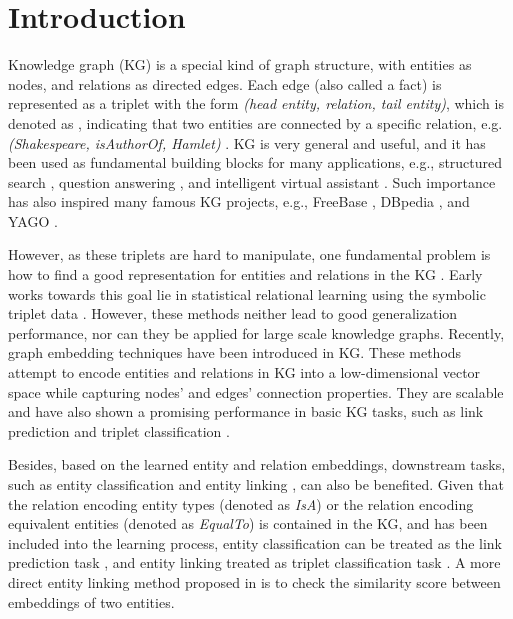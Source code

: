 \documentclass[conference]{IEEEtran}
\begin{document}
\section{Introduction}

Knowledge graph (KG) is a special kind of graph structure, 
with entities as nodes, 
and relations as directed edges. 
Each edge (also called a fact) is represented as a triplet with the form \emph{(head entity, relation, tail entity)}, 
which is denoted as , indicating that two entities are connected by a specific relation, 
e.g. \emph{(Shakespeare, isAuthorOf,  Hamlet)} \cite{bollacker2008freebase,miller1995wordnet,auer2007dbpedia,suchanek2007yago}.
KG is very general and useful,
and it has been used as fundamental building blocks for many applications,
e.g., structured search \cite{singhal2012introducing},
question answering \cite{bordes2014open, bordes2014question},
and intelligent virtual assistant \cite{white1991knowledge}.
Such importance
has also inspired many famous KG projects,
e.g.,
FreeBase \cite{bollacker2008freebase},
DBpedia \cite{auer2007dbpedia},
and YAGO \cite{suchanek2007yago}.


However,
as these triplets are hard to manipulate,
one fundamental problem is how to find a good representation for entities and relations in the KG \cite{nickel2016review}.
Early works towards this goal lie in statistical relational learning using the symbolic triplet data \cite{kok2007statistical, getoor2007introduction, lao2011random}. 
However, these methods neither lead to good generalization performance, 
nor can they be applied for large scale knowledge graphs. 
Recently, 
graph embedding techniques \cite{wang2017knowledge} have been introduced in KG.
These methods attempt to encode entities and relations in KG into a low-dimensional vector space
while capturing nodes' and edges' connection properties.
They are scalable and have also shown a promising performance in basic KG tasks, 
such as link prediction and triplet classification \cite{bordes2013translating, wang2017knowledge}. 

{
Besides,
based on the learned entity and relation embeddings, downstream tasks, 
such as entity classification \cite{nickel2011three} and entity linking \cite{bordes2014semantic},
can also be benefited.
Given that the relation encoding entity types (denoted as \textit{IsA}) 
or the relation encoding equivalent entities (denoted as \textit{EqualTo}) is contained in the KG,
and has been included into the learning process,
entity classification can be treated as the link prediction task , 
and entity linking treated as triplet classification task .
A more direct entity linking method proposed in \cite{nickel2011three} is to check the similarity score 
between embeddings of two entities. 
}
\end{document}

